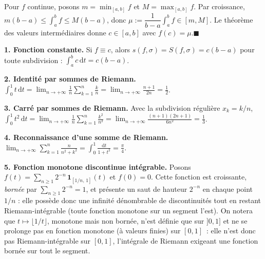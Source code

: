 
\begin{mdframed}[style=proofbar]
  Pour $f$ continue, posons $m = \min_{[a,b]} f$ et $M = \max_{[a,b]} f$.
  Par croissance, $m(b-a) \leq \int_a^b f \leq M(b-a)$, donc
  $\mu := \dfrac{1}{b-a}\int_a^b f \in [m, M]$. Le théorème des valeurs
  intermédiaires donne
  $c\in[a,b]$ avec $f(c) = \mu$.\hfill$\blacksquare$
\end{mdframed}

\decsep{}



\begin{mdframed}[style=exbar]
  \textbf{1. Fonction constante.}\enspace%
  Si $f \equiv c$, alors $s(f,\sigma) = S(f,\sigma) = c(b-a)$ pour toute
  subdivision : $\int_a^b c\,\mathrm{d}t = c(b-a)$.

  \smallskip\noindent
  \textbf{2. Identité par sommes de Riemann.}\enspace%
  $\displaystyle\int_0^1 t\,\mathrm{d}t = \lim_{n\to+\infty}\frac{1}{n}\sum_{k=1}^{n}\frac{k}{n}
   = \lim_{n\to+\infty}\frac{n+1}{2n} = \frac{1}{2}$.

  \smallskip\noindent
  \textbf{3. Carré par sommes de Riemann.}\enspace%
  Avec la subdivision régulière $x_k = k/n$,
  $\displaystyle\int_0^1 t^2\,\mathrm{d}t = \lim_{n\to+\infty}\frac{1}{n}\sum_{k=1}^{n}\frac{k^2}{n^2}
   = \lim_{n\to+\infty}\frac{(n+1)(2n+1)}{6n^2} = \frac{1}{3}$.

  \smallskip\noindent
  \textbf{4. Reconnaissance d'une somme de Riemann.}\enspace%
  $\displaystyle\lim_{n\to+\infty}\sum_{k=1}^{n}\frac{n}{n^2 + k^2}
   = \int_0^1 \frac{\mathrm{d}t}{1+t^2} = \frac{\pi}{4}$.

  \smallskip\noindent
  \textbf{5. Fonction monotone discontinue intégrable.}\enspace%
  Posons $f(t) = \sum_{n\geq 1} 2^{-n}\,\mathbf{1}_{[1/n,\,1]}(t)$ et $f(0)=0$.
  Cette fonction est croissante, \emph{bornée} par $\sum_{n\geq 1}2^{-n} = 1$,
  et présente un saut de hauteur $2^{-n}$ en chaque point $1/n$ : elle possède
  donc une infinité dénombrable de discontinuités tout en restant
  Riemann-intégrable (toute fonction monotone sur un segment l'est). On notera
  que $t\mapsto\lfloor 1/t\rfloor$, monotone mais non bornée, n'est définie
  que sur $]0,1]$ et ne se prolonge pas en fonction monotone (à valeurs
  finies) sur $[0,1]$~: elle n'est donc pas Riemann-intégrable sur $[0,1]$,
  l'intégrale de Riemann exigeant une fonction bornée sur tout le segment.
\end{mdframed}

